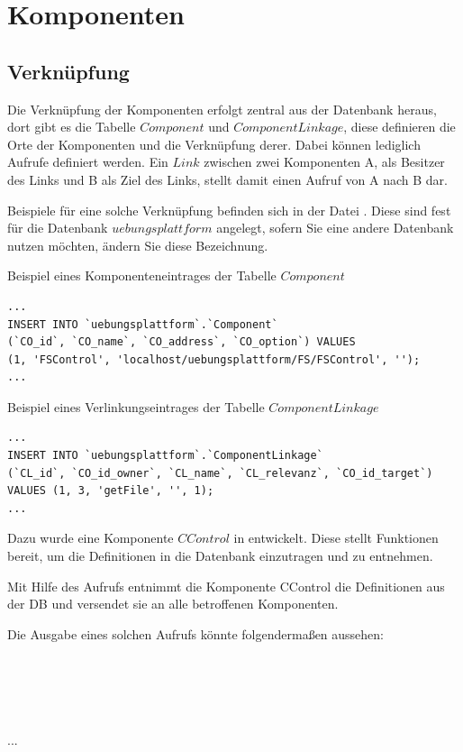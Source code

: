  \section{Komponenten}
 
 \subsection{Verknüpfung\label{Verknuepfung}}%
Die Verknüpfung der Komponenten erfolgt zentral aus der Datenbank heraus, dort gibt es die Tabelle $Component$ und $ComponentLinkage$, diese definieren die Orte der Komponenten und die Verknüpfung derer. Dabei können lediglich Aufrufe definiert werden. Ein $Link$ zwischen zwei Komponenten A, als Besitzer des Links und B als Ziel des Links, stellt damit einen Aufruf von A nach B dar.

Beispiele für eine solche Verknüpfung befinden sich in der Datei .
Diese sind fest für die Datenbank $uebungsplattform$ angelegt, sofern Sie eine andere Datenbank nutzen möchten, ändern Sie diese Bezeichnung.

\begin{minipage}{\textwidth}
Beispiel eines Komponenteneintrages der Tabelle $Component$
\begin{lstlisting}
...
INSERT INTO `uebungsplattform`.`Component` 
(`CO_id`, `CO_name`, `CO_address`, `CO_option`) VALUES 
(1, 'FSControl', 'localhost/uebungsplattform/FS/FSControl', '');
...
\end{lstlisting}
\end{minipage}

\begin{minipage}{\textwidth}
Beispiel eines Verlinkungseintrages der Tabelle $ComponentLinkage$
\begin{lstlisting}
...
INSERT INTO `uebungsplattform`.`ComponentLinkage` 
(`CL_id`, `CO_id_owner`, `CL_name`, `CL_relevanz`, `CO_id_target`) 
VALUES (1, 3, 'getFile', '', 1);
...
\end{lstlisting}
\end{minipage}


Dazu wurde eine Komponente $CControl$ in  entwickelt. Diese stellt Funktionen bereit, um die Definitionen in die Datenbank einzutragen und zu entnehmen.

Mit Hilfe des Aufrufs  entnimmt die Komponente CControl die Definitionen aus der DB und versendet sie an alle betroffenen Komponenten. 

Die Ausgabe eines solchen Aufrufs könnte folgendermaßen aussehen: \\
\\
\\
\\
\\
\\
...\\

